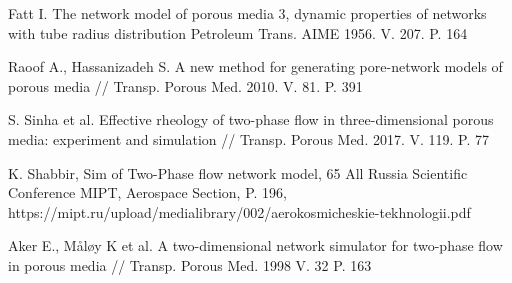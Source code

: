 \documentclass[11pt]{article}
\begin{document}
	\begin{thebibliography}{}
			 Fatt I. The network model of porous media 3, dynamic properties of networks with tube radius distribution Petroleum Trans. AIME 1956. V. 207. P. 164
		
			Raoof A., Hassanizadeh S. A new method for generating pore-network models of porous media // Transp. Porous Med. 2010. V. 81. P. 391
			 
			S. Sinha et al. Effective rheology of two-phase flow in three-dimensional porous media: experiment and simulation // Transp. Porous Med. 2017. V. 119. P. 77
			
			K. Shabbir, Sim of Two-Phase flow network model, 65 All Russia Scientific Conference MIPT, Aerospace Section, P. 196, https://mipt.ru/upload/medialibrary/002/aerokosmicheskie-tekhnologii.pdf
			
			Aker E., Måløy K et al. A two-dimensional network simulator for two-phase flow in porous media // Transp. Porous Med. 1998 V. 32 P. 163
	
	\end{thebibliography}
\end{document}
